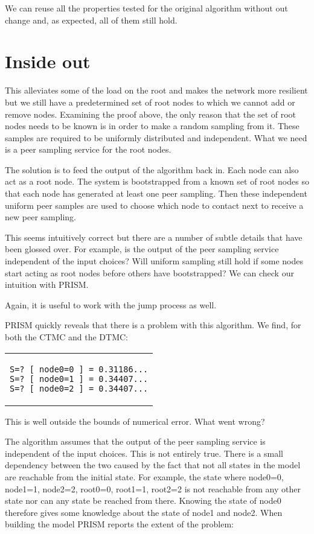 \documentclass[a4paper,10pt]{article}
\newcommand{\prismmodel}[1]{
  \begin{quotation}
  \footnotesize
  
  \end{quotation}
}
\newenvironment{prismprop}[0]{
  \begin{center}
  \begin{tabular}{c}
  \footnotesize
}{
  \end{tabular}
  \end{center}
}
\begin{document}
We can reuse all the properties tested for the original algorithm without out change and, as expected, all of them still hold.

\section{Inside out}

This alleviates some of the load on the root and makes the network more resilient but we still have a predetermined set of root nodes to which we cannot add or remove nodes. Examining the proof above, the only reason that the set of root nodes needs to be known is in order to make a random sampling from it. These samples are required to be uniformly distributed and independent. What we need is a peer sampling service for the root nodes.

The solution is to feed the output of the algorithm back in. Each node can also act as a root node. The system is bootstrapped from a known set of root nodes so that each node has generated at least one peer sampling. Then these independent uniform peer samples are used to choose which node to contact next to receive a new peer sampling.

This seems intuitively correct but there are a number of subtle details that have been glossed over. For example, is the output of the peer sampling service independent of the input choices? Will uniform sampling still hold if some nodes start acting as root nodes before others have bootstrapped? We can check our intuition with PRISM.

\prismmodel{ctmc_broken}

Again, it is useful to work with the jump process as well.

\prismmodel{dtmc_broken}

PRISM quickly reveals that there is a problem with this algorithm. We find, for both the CTMC and the DTMC:

\begin{prismprop}
\begin{lstlisting}
S=? [ node0=0 ] = 0.31186...
S=? [ node0=1 ] = 0.34407...
S=? [ node0=2 ] = 0.34407...
\end{lstlisting}
\end{prismprop}

This is well outside the bounds of numerical error. What went wrong? 

The algorithm assumes that the output of the peer sampling service is independent of the input choices. This is not entirely true. There is a small dependency between the two caused by the fact that not all states in the model are reachable from the initial state. For example, the state where node0=0, node1=1, node2=2, root0=0, root1=1, root2=2 is not reachable from any other state nor can any state be reached from there. Knowing the state of node0 therefore gives some knowledge about the state of node1 and node2. When building the model PRISM reports the extent of the problem:
\end{document}
